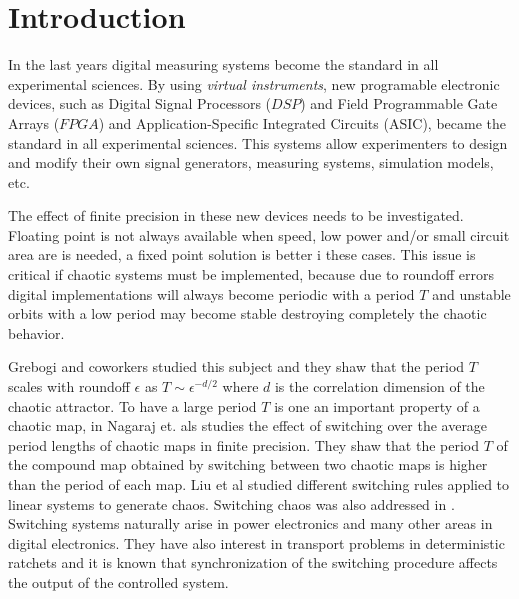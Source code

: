 \section{Introduction} \label{sec:intro}

In the last years digital measuring systems become the standard in all experimental sciences.
By using \textit{virtual instruments}, new programable electronic devices, such as Digital Signal Processors ($DSP$) and Field Programmable Gate Arrays ($FPGA$) and Application-Specific Integrated Circuits (ASIC), became the standard in all experimental sciences.
This systems allow experimenters to design and modify their own signal generators, measuring systems, simulation models, etc.

The effect of finite precision in these new devices needs to be investigated.
Floating point is not always available when speed, low power and/or small circuit area are is needed, a fixed point solution is better i these cases.
This issue is critical if chaotic systems must be implemented, because due to roundoff errors digital implementations will always become periodic with a period $T$ and unstable orbits with a low period may become stable destroying completely the chaotic behavior.

Grebogi and coworkers \cite{Grebogi1988} studied this subject and they shaw that the period $T$ scales with roundoff $\epsilon$ as $T\sim\epsilon^{-d/2}$ where $d$ is the correlation dimension of the chaotic attractor.
To have a large period $T$ is one an important property of a chaotic map, in \cite{Nagaraj2008} Nagaraj et. als studies the effect of switching over the average period lengths of chaotic maps in finite precision.
They shaw that the period $T$ of the compound map obtained by switching between two chaotic maps is higher than the period of each map.
Liu et al \cite{Liu2006} studied different switching rules applied to linear systems to generate chaos.
Switching chaos was also addressed in \cite{Gluskin2008}.
Switching systems naturally arise in power electronics and many other areas in digital electronics.
They have also interest in transport problems in deterministic ratchets \cite{Zarlenga2009} and it is known that synchronization of the switching procedure affects the output of the controlled system.

